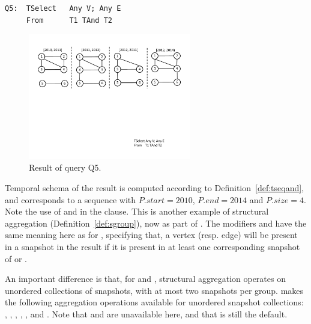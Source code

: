 \begin{small}
\begin{verbatim}
Q5:  TSelect   Any V; Any E
     From      T1 TAnd T2
\end{verbatim}
\end{small}

\begin{figure}
\centering
\includegraphics[width=2.8in]{figs/q5.pdf}
\caption{Result of query Q5.}
\vspace{-0.1in}
\label{fig:q5}
\end{figure}

Temporal schema of the result is computed according to
Definition~\ref{def:tseqand}, and corresponds to a sequence with
$P.start = 2010$, $P.end=2014$ and $P.size=4$.  Note the use of
 and  in the  clause.  This
is another example of structural aggregation
(Definition~\ref{def:sgroup}), now as part of .  The
modifiers  and  have the same meaning here as
for , specifying that, a vertex (resp. edge) will be
present in a snapshot in the result if it is present in at least one
corresponding snapshot of  or .  

An important difference is that, for  and ,
structural aggregation operates on unordered collections of snapshots,
with at most two snapshots per group.  \ql makes the following
aggregation operations available for unordered snapshot collections:
, , , , , and
.  Note that  and  are
unavailable here, and that  is still the default.



